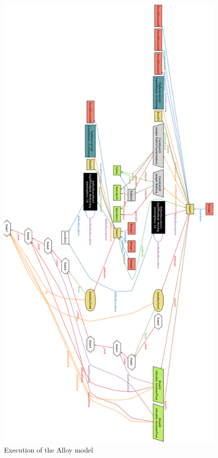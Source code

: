 \begin{figure}
	\vspace*{-0.5cm}
	\centering\includegraphics[height=\textheight]{Images/AlloyShowUser.png}
	\caption{Execution of the Alloy model}
\end{figure}

